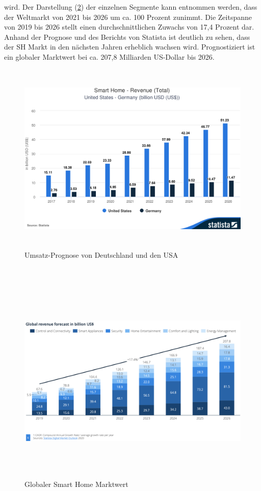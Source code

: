         wird. Der Darstellung (\ref{pic:globalmarket}) der einzelnen Segmente kann entnommen werden, dass der Weltmarkt von 
        2021 bis 2026 um ca. 100 Prozent zunimmt. Die Zeitspanne von 2019 bis 2026 stellt einen durchschnittlichen Zuwachs von 
        17,4 Prozent dar. Anhand der Prognose und des Berichts von Statista ist deutlich zu sehen, dass der \acl{SH} Markt in 
        den nächsten Jahren erheblich wachsen wird. Prognostiziert ist ein globaler Marktwert bei ca. 207,8 Milliarden 
        US-Dollar bis 2026.
        \begin{figure}[hbt!]
            \centering
            \includegraphics[width=15cm,height=9.25cm,keepaspectratio]{images/Statista-Outlook-Smart-Home---Revenue-Total-United-States---Germany-billion-USD-US.png}
            \caption{Umsatz-Prognose von Deutschland und den USA} 
            \label{pic:revenue}
        \end{figure}
        \\
        \begin{figure}[hbt!]
            \centering
            \includegraphics[width=15cm,height=10cm,keepaspectratio]{images/global_Worth_smart-home.png}
            \caption{Globaler Smart Home Marktwert \cite{statista2021}} 
            \label{pic:globalmarket}
        \end{figure}
        \pagebreak 
